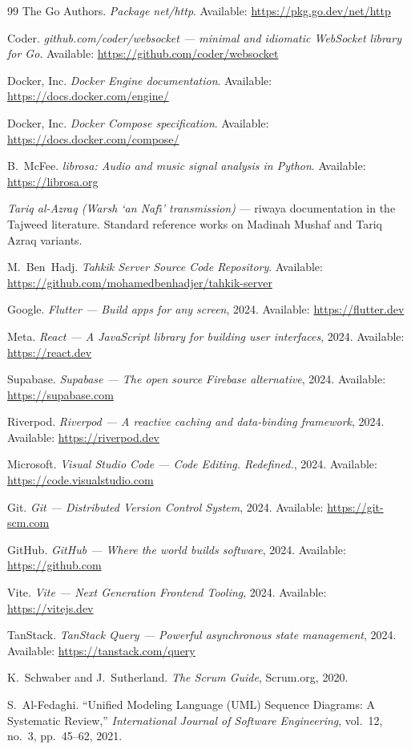 \begin{thebibliography}{99}
The Go Authors. \emph{Package net/http}.
Available: \url{https://pkg.go.dev/net/http}

Coder. \emph{github.com/coder/websocket --- minimal and idiomatic WebSocket
library for Go}.
Available: \url{https://github.com/coder/websocket}

Docker, Inc. \emph{Docker Engine documentation}.
Available: \url{https://docs.docker.com/engine/}

Docker, Inc. \emph{Docker Compose specification}.
Available: \url{https://docs.docker.com/compose/}

B.~McFee. \emph{librosa: Audio and music signal analysis in Python}.
Available: \url{https://librosa.org}

\emph{Tariq al-Azraq (Warsh `an Naf{\^\i}' transmission)} ---
riwaya documentation in the Tajweed literature.
Standard reference works on Madinah Mushaf and Tariq Azraq variants.

M.~Ben~Hadj. \emph{Tahkik Server Source Code Repository}.
Available: \url{https://github.com/mohamedbenhadjer/tahkik-server}

Google. \emph{Flutter --- Build apps for any screen}, 2024.
Available: \url{https://flutter.dev}

Meta. \emph{React --- A JavaScript library for building user interfaces}, 2024.
Available: \url{https://react.dev}

Supabase. \emph{Supabase --- The open source Firebase alternative}, 2024.
Available: \url{https://supabase.com}

Riverpod. \emph{Riverpod --- A reactive caching and data-binding framework},
2024. Available: \url{https://riverpod.dev}

Microsoft. \emph{Visual Studio Code --- Code Editing. Redefined.}, 2024.
Available: \url{https://code.visualstudio.com}

Git. \emph{Git --- Distributed Version Control System}, 2024.
Available: \url{https://git-scm.com}

GitHub. \emph{GitHub --- Where the world builds software}, 2024.
Available: \url{https://github.com}

Vite. \emph{Vite --- Next Generation Frontend Tooling}, 2024.
Available: \url{https://vitejs.dev}

TanStack. \emph{TanStack Query --- Powerful asynchronous state management},
2024. Available: \url{https://tanstack.com/query}

K.~Schwaber and J.~Sutherland. \emph{The Scrum Guide}, Scrum.org, 2020.

S.~Al-Fedaghi. ``Unified Modeling Language (UML) Sequence Diagrams: A
Systematic Review,'' \textit{International Journal of Software Engineering},
vol.~12, no.~3, pp.~45--62, 2021.

\end{thebibliography}
